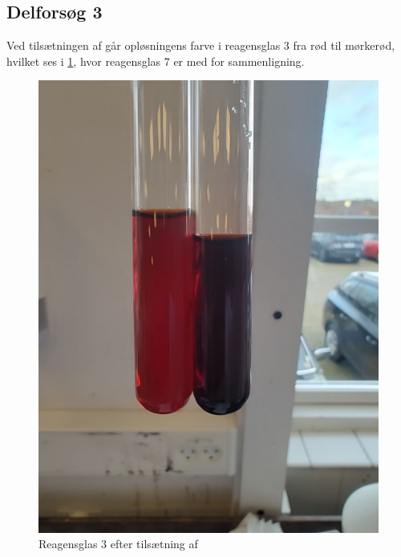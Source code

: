 \documentclass{report}
\begin{document}
\subsection*{Delforsøg 3}
Ved tilsætningen af  går opløsningens farve i reagensglas 3 fra rød til mørkerød, hvilket ses i \cref{fig:for3}, hvor reagensglas 7 er med for sammenligning.
\begin{figure}[H]
\begin{center}
  \includegraphics[scale=0.2]{for3.jpeg}
\end{center}
\caption{Reagensglas 3 efter tilsætning af }
\label{fig:for3}
\end{figure}
\end{document}
